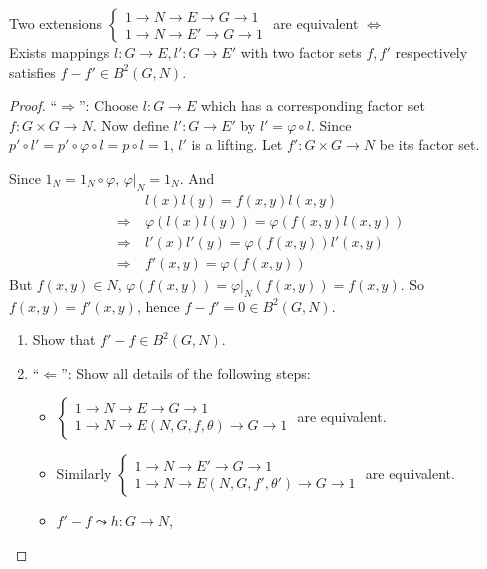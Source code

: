 \begin{theorem}
  Two extensions $\begin{cases}
    1\to N\to E\to G\to 1 \\
    1\to N\to E'\to G\to 1
  \end{cases}$ are equivalent $\iff$ \\
  Exists mappings $l: G\to E, l': G\to E'$ with two factor sets $f, f'$ respectively satisfies
  $f - f' \in B^2(G, N)$.

  \begin{proof}
    ``$\Rightarrow$'': Choose $l: G\to E$ which has a corresponding factor set $f: G\times G \to N$.
    Now define $l': G\to E'$ by $l' = \varphi \circ l$. Since 
    $p' \circ l' = p' \circ \varphi \circ l = p \circ l = 1$, $l'$ is a lifting.
    Let   $f': G\times G \to N$ be its factor set.
    
    Since $1_N = 1_N \circ \varphi$, $\varphi \big|_N = 1_N$. And
    \begin{align*}
      & l(x) l(y) = f(x, y) l(x, y) \\
      \Rightarrow \ & \varphi(l(x) l(y)) = \varphi(f(x, y) l(x, y)) \\
      \Rightarrow \ & l'(x) l'(y) = \varphi(f(x, y)) l'(x, y) \\
      \Rightarrow \ & f'(x, y) = \varphi(f(x, y))
    \end{align*}
    But $f(x, y) \in N$, $\varphi(f(x, y)) = \varphi\big|_N(f(x, y)) = f(x, y)$. So $f(x, y) = f'(x, y)$,
    hence $f - f' = 0 \in B^2(G, N)$.
    \begin{exercise} \mbox{}
      \begin{enumerate}[(1)]
        \item Show that $f' - f \in B^2(G, N)$.
        \item ``$\Leftarrow$'': Show all details of the following steps:
          \begin{itemize}
            \item $\begin{cases}
                1\to N\to E \to G \to 1 \\
                1\to N\to E(N, G, f, \theta) \to G\to 1
              \end{cases}$ are equivalent.
            \item Similarly $\begin{cases}
                1\to N\to E' \to G\to 1 \\
                1\to N\to E(N, G, f', \theta')\to G\to 1
              \end{cases}$ are equivalent.
            \item $f'-f \leadsto h:G\to N$,
          \end{itemize}
          \qedhere
      \end{enumerate}
    \end{exercise}
  \end{proof}
\end{theorem}


